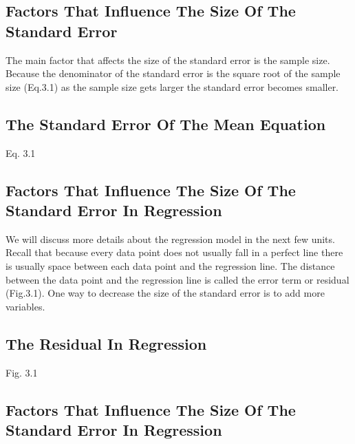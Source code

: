 \documentclass[]{book}
\theoremstyle{definition}
\theoremstyle{definition}
\theoremstyle{definition}
\theoremstyle{remark}
\begin{document}
\hypertarget{factors-that-influence-the-size-of-the-standard-error}{%
\subsection{Factors That Influence The Size Of The Standard
Error}\label{factors-that-influence-the-size-of-the-standard-error}}

The main factor that affects the size of the standard error is the
sample size. Because the denominator of the standard error is the square
root of the sample size (Eq.3.1) as the sample size gets larger the
standard error becomes smaller.

\hypertarget{the-standard-error-of-the-mean-equation}{%
\subsection{The Standard Error Of The Mean
Equation}\label{the-standard-error-of-the-mean-equation}}

Eq. 3.1

\hypertarget{factors-that-influence-the-size-of-the-standard-error-in-regression}{%
\subsection{Factors That Influence The Size Of The Standard Error In
Regression}\label{factors-that-influence-the-size-of-the-standard-error-in-regression}}

We will discuss more details about the regression model in the next few
units. Recall that because every data point does not usually fall in a
perfect line there is usually space between each data point and the
regression line. The distance between the data point and the regression
line is called the error term or residual (Fig.3.1). One way to decrease
the size of the standard error is to add more variables.

\hypertarget{the-residual-in-regression}{%
\subsection{The Residual In
Regression}\label{the-residual-in-regression}}

Fig. 3.1

\hypertarget{factors-that-influence-the-size-of-the-standard-error-in-regression-1}{%
\subsection{Factors That Influence The Size Of The Standard Error In
Regression}\label{factors-that-influence-the-size-of-the-standard-error-in-regression-1}}
\end{document}
